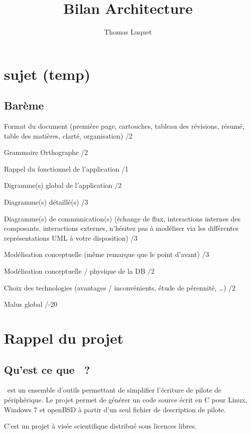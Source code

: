 \documentclass{rtxreport}
\author{Thomas Luquet}
\title{Bilan Architecture}
\begin{document}
\maketitle

\rtxmaketitleblock

\tableofcontents

\chapter{sujet (temp)}

\section{Barème}

Format du document (première page, cartouches, tableau des révisions, résumé,
table des matières, clarté, organisation) /2

Grammaire Orthographe /2

Rappel du fonctionnel de l'application /1

Digramme(s) global de l'application /2

Diagramme(s) détaillé(s) /3

Diagramme(s) de communication(s) (échange de flux, interactions internes des
composants, interactions externes, n'hésitez pas à modéliser via les différentes
représentations UML à votre disposition) /3

Modélisation conceptuelle (même remarque que le point d'avant) /3

Modélisation conceptuelle / physique de la DB /2

Choix des technologies (avantages / inconvénients, étude de pérennité, …) /2

Malus global /-20

\chapter{Rappel du projet}

\section{Qu'est ce que \rtx\ ?}

\rtx\ est un ensemble d'outils permettant de simplifier l'écriture de pilote de
périphérique. Le projet permet de générer un code source écrit en C pour Linux,
Windows 7 et openBSD à partir d'un seul fichier de description de pilote.

C'est un projet à visée scientifique distribué sous licences libres.
\end{document}

